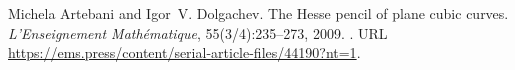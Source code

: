 Michela Artebani and Igor~V. Dolgachev.
\newblock The Hesse pencil of plane cubic curves.
\newblock \emph{L'Enseignement Math\'ematique}, 55(3/4):235--273, 2009.
\newblock {}.
\newblock URL \url{https://ems.press/content/serial-article-files/44190?nt=1}.

